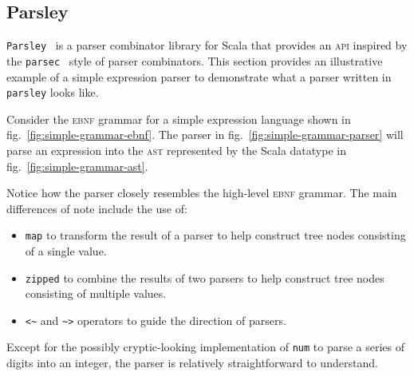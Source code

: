 \documentclass[../../main.tex]{subfiles}
\begin{document}
\subsection{Parsley}

\texttt{Parsley}~\cite{willis_garnishing_2018} is a parser combinator library for Scala that provides an \textsc{api} inspired by the \texttt{parsec}~\cite{leijen_parsec_2001} style of parser combinators.
This section provides an illustrative example of a simple expression parser to demonstrate what a parser written in \texttt{parsley} looks like.

Consider the \textsc{ebnf} grammar for a simple expression language shown in fig.~\ref{fig:simple-grammar-ebnf}.
The parser in fig.~\ref{fig:simple-grammar-parser} will parse an expression into the \textsc{ast} represented by the Scala datatype in fig.~\ref{fig:simple-grammar-ast}.

Notice how the parser closely resembles the high-level \textsc{ebnf} grammar.
The main differences of note include the use of:
\begin{itemize}
  \item \texttt{map} to transform the result of a parser to help construct tree nodes consisting of a single value.
  \item \texttt{zipped} to combine the results of two parsers to help construct tree nodes consisting of multiple values.
  \item \texttt{<\textasciitilde} and \texttt{\textasciitilde>} operators to guide the direction of parsers.
\end{itemize}
Except for the possibly cryptic-looking implementation of \texttt{num} to parse a series of digits into an integer, the parser is relatively straightforward to understand.
\end{document}
